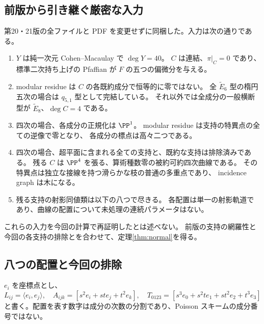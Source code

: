 \subsection{前版から引き継ぐ厳密な入力}
第20・21版の全ファイルと PDF を変更せずに同梱した。入力は次の通りである。
\begin{enumerate}
\item $Y$ は純一次元 Cohen--Macaulay で $\deg Y=40$。
$C$ は連結、$\pi|_C=0$ であり、標準二次持ち上げの Pfaffian が $F$ の五つの偏微分を与える。
\item modular residue は $C$ の各既約成分で恒等的に零ではない。
全 $\widetilde E_6$ 型の楕円五次の場合は $q_{5,1}$ 型として完結している。
それ以外では全成分の一般横断型が $\widetilde E_8$、$\deg C=4$ である。
\item 四次の場合、各成分の正規化は $\PP^1$。
modular residue は支持の特異点の全ての逆像で零となり、
各成分の標点は高々二つである。
\item 四次の場合、超平面に含まれる全ての支持と、既約な支持は排除済みである。
残る $C$ は $\PP^4$ を張る、算術種数零の被約可約四次曲線である。
その特異点は独立な接線を持つ滑らかな枝の普通の多重点であり、
incidence graph は木になる。
\item 残る支持の射影同値類は以下の八つで尽きる。
各配置は単一の射影軌道であり、曲線の配置について未処理の連続パラメータはない。
\end{enumerate}
これらの入力を今回の計算で再証明したとは述べない。
前版の支持の網羅性と今回の各支持の排除とを合わせて、定理\ref{thm:normal}を得る。

\subsection{八つの配置と今回の排除}
$e_i$ を座標点とし、
\[
 L_{ij}=\langle e_i,e_j\rangle,\quad
 A_{ijk}=[s^2e_i+st e_j+t^2e_k],\quad
 T_{0123}=[s^3e_0+s^2te_1+st^2e_2+t^3e_3]
\]
と書く。配置を表す数字は成分の次数の分割であり、Poisson スキームの成分番号ではない。

